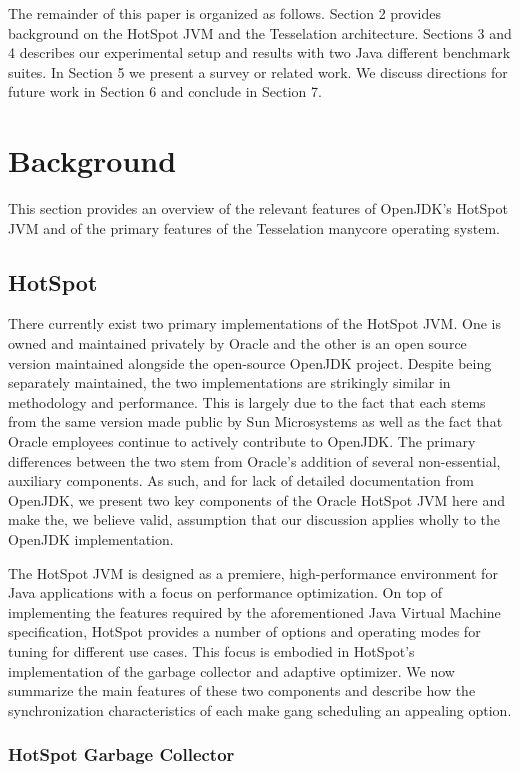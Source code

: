 \documentclass{sig-alternate}
\begin{document}
The remainder of this paper is organized as follows. Section 2 provides background on the HotSpot JVM and the Tesselation architecture. Sections 3 and 4 describes our experimental setup and results with two Java different benchmark suites. In Section 5 we present a survey or related work. We discuss directions for future work in Section 6 and conclude in Section 7.

\section{Background}

This section provides an overview of the relevant features of OpenJDK's HotSpot JVM and of the primary features of the Tesselation manycore operating system.

\subsection{HotSpot}
There currently exist two primary implementations of the HotSpot JVM. One is owned and maintained privately by Oracle and the other is an open source version maintained alongside the open-source OpenJDK project. Despite being separately maintained, the two implementations are strikingly similar in methodology and performance. This is largely due to the fact that each stems from the same version made public by Sun Microsystems as well as the fact that Oracle employees continue to actively contribute to OpenJDK. The primary differences between the two stem from Oracle's addition of several non-essential, auxiliary components. As such, and for lack of detailed documentation from OpenJDK, we present two key components of the Oracle HotSpot JVM here and make the, we believe valid, assumption that our discussion applies wholly to the OpenJDK implementation.

The HotSpot JVM is designed as a premiere, high-performance environment for Java applications with a focus on performance optimization. On top of implementing the features required by the aforementioned Java Virtual Machine specification, HotSpot provides a number of options and operating modes for tuning for different use cases. This focus is embodied in HotSpot's implementation of the garbage collector and adaptive optimizer. We now summarize the main features of these two components and describe how the synchronization characteristics of each make gang scheduling an appealing option.

\subsubsection{HotSpot Garbage Collector}
\end{document}
